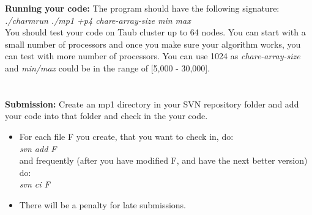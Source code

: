 \documentclass{article}
\begin{document}
\textbf{Running your code:}
The program should have the following signature: \\
\textit{./charmrun ./mp1 +p4 chare-array-size min max} \\

You should test your code on Taub cluster up to 64 nodes. You can start with a small
number of processors and once you make sure your algorithm works, you can test
with more number of processors. You can use 1024 as
\textit{chare-array-size} and \textit{min/max} could be in the range of [5,000 - 30,000].
\\ \\ \\

\textbf{Submission:}
Create an mp1 directory in your SVN repository folder and add your code into
that folder and check in the your code.
\begin{itemize}
\item  For each file F you create, that you want to check in, do: \\
        \textit{svn add F}\\
        and frequently (after you have modified F, and have the next better
        version) do:\\ 
        \textit{svn ci F}
\item  There will be a penalty for late submissions.
\end{itemize}
\end{document}
